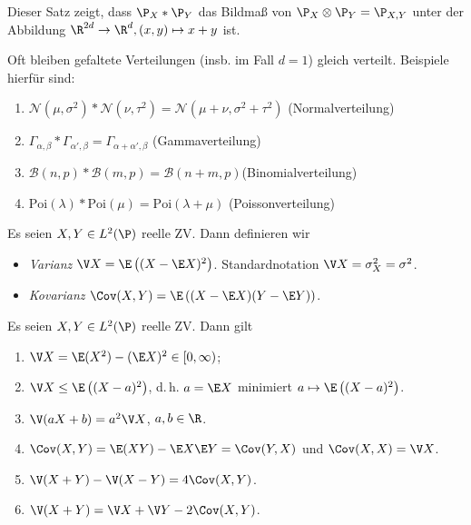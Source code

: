 \documentclass[11pt, a4paper]{article}
\begin{document}
\begin{note}
    Dieser Satz zeigt, dass $\P_X  * \P_Y $ das Bildmaß von $\P_X\otimes \P_Y = \P_{X,Y}$ unter der Abbildung $\R^{2d}\to \R^d, (x,y) \mapsto x+y$ ist.
\end{note}

\begin{example} Oft bleiben gefaltete Verteilungen (insb. im Fall $d=1$) gleich verteilt. Beispiele hierfür sind:
\begin{enumerate}
    \item $\mathcal N(\mu , \sigma ^2 ) * \mathcal N(\nu, \tau^2 ) = \mathcal N(\mu + \nu , \sigma^2 + \tau ^2)$ \hfill (Normalverteilung)
    \item $\Gamma_{\alpha, \beta} * \Gamma _{\alpha ' , \beta} = \Gamma_{\alpha + \alpha', \beta}$ \hfill (Gammaverteilung)
    \item $\mathcal B (n,p) *\mathcal B(m,p) = \mathcal B(n+m, p)$\hfill (Binomialverteilung)
    \item $\mathrm{Poi}(\lambda)*\mathrm{Poi}(\mu) =\mathrm{Poi}(\lambda + \mu) $ \hfill (Poissonverteilung)
\end{enumerate}
\end{example}

\begin{definition} \Theorem
    Es seien $X, Y \in L^2(\P)$ reelle ZV. Dann definieren wir
    \begin{itemize}[label=--]
        \item \emph{Varianz} $\V X = \E\left((X - \E X)^2\right)$. Standardnotation $\V X = \sigma_X^2 = \sigma^2$.
        \item \emph{Kovarianz} $\Cov(X,Y) = \E\left((X - \E X)(Y - \E Y)\right)$.
    \end{itemize}
\end{definition}

\begin{lemma}
    Es seien $X, Y \in L^2(\P)$ reelle ZV. Dann gilt
    \begin{enumerate}[label=\alph*)]
        \item $\V X = \E(X^2) - (\E X)^2 \in [0, \infty)$;
        \item $\V X \le \E\left((X-a)^2\right)$, d.\,h. $a = \E X$ minimiert $a \mapsto \E\left((X-a)^2\right)$.
        \item $\V(aX+b) = a^2 \V X$, $a, b \in \R$.
        \item $\Cov(X,Y) = \E(XY) - \E X \E Y = \Cov(Y,X)$ und $\Cov(X,X) = \V X$.
        \item $\V(X+Y) - \V(X-Y) = 4\Cov(X,Y)$.
        \item $\V(X+Y) = \V X + \V Y - 2\Cov(X,Y)$.
    \end{enumerate}
\end{lemma}
\end{document}
